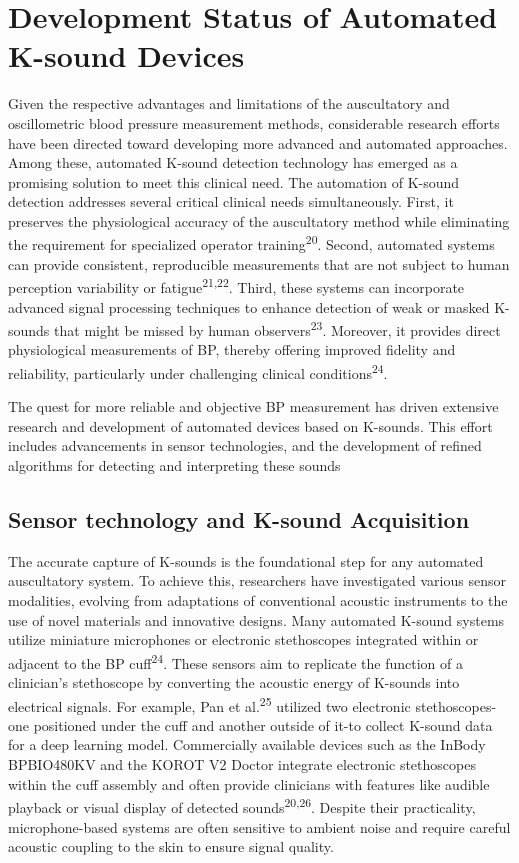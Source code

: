 \documentclass[
  12pt,
  letterpaper,
  openany,
  oneside]{book}
\begin{document}
\section{Development Status of Automated K-sound
Devices}\label{development-status-of-automated-k-sound-devices}

Given the respective advantages and limitations of the auscultatory and
oscillometric blood pressure measurement methods, considerable research
efforts have been directed toward developing more advanced and automated
approaches. Among these, automated K-sound detection technology has
emerged as a promising solution to meet this clinical need. The
automation of K-sound detection addresses several critical clinical
needs simultaneously. First, it preserves the physiological accuracy of
the auscultatory method while eliminating the requirement for
specialized operator training\textsuperscript{20}. Second, automated
systems can provide consistent, reproducible measurements that are not
subject to human perception variability or
fatigue\textsuperscript{21,22}. Third, these systems can incorporate
advanced signal processing techniques to enhance detection of weak or
masked K-sounds that might be missed by human
observers\textsuperscript{23}. Moreover, it provides direct
physiological measurements of BP, thereby offering improved fidelity and
reliability, particularly under challenging clinical
conditions\textsuperscript{24}.

The quest for more reliable and objective BP measurement has driven
extensive research and development of automated devices based on
K-sounds. This effort includes advancements in sensor technologies, and
the development of refined algorithms for detecting and interpreting
these sounds

\subsection{Sensor technology and K-sound
Acquisition}\label{sensor-technology-and-k-sound-acquisition}

The accurate capture of K-sounds is the foundational step for any
automated auscultatory system. To achieve this, researchers have
investigated various sensor modalities, evolving from adaptations of
conventional acoustic instruments to the use of novel materials and
innovative designs. Many automated K-sound systems utilize miniature
microphones or electronic stethoscopes integrated within or adjacent to
the BP cuff\textsuperscript{24}. These sensors aim to replicate the
function of a clinician's stethoscope by converting the acoustic energy
of K-sounds into electrical signals. For example, Pan et
al.\textsuperscript{25} utilized two electronic stethoscopes-one
positioned under the cuff and another outside of it-to collect K-sound
data for a deep learning model. Commercially available devices such as
the InBody BPBIO480KV and the KOROT V2 Doctor integrate electronic
stethoscopes within the cuff assembly and often provide clinicians with
features like audible playback or visual display of detected
sounds\textsuperscript{20,26}. Despite their practicality,
microphone-based systems are often sensitive to ambient noise and
require careful acoustic coupling to the skin to ensure signal quality.
\end{document}
